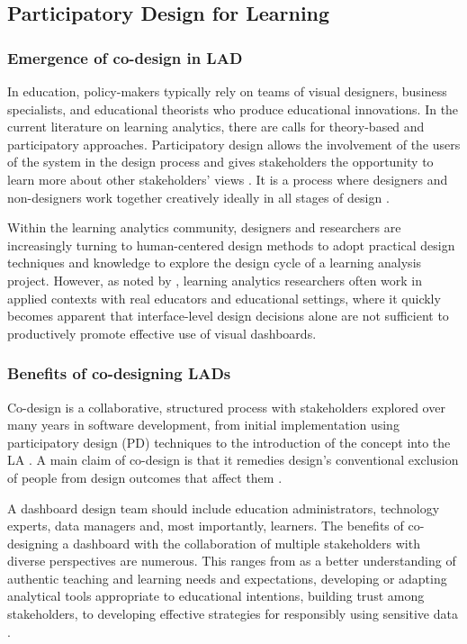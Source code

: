 \documentclass[manuscript,nonacm,12pt]{acmart}
\begin{document}
\subsection{Participatory Design for Learning}
\subsubsection{Emergence of co-design in LAD}
In education, policy-makers typically rely on teams of visual designers, business specialists, and educational theorists who produce educational innovations. 
In the current literature on learning analytics, there are calls for theory-based and participatory approaches. Participatory design allows the involvement of the users of the system in the design process and gives stakeholders the opportunity to learn more about other stakeholders' views \cite{unger2013designing}. It is a process where designers and non-designers work together creatively ideally in all stages of design 
\cite{Sanders2008}. 

Within the learning analytics community, designers and researchers are increasingly turning to human-centered design methods to adopt practical design techniques and knowledge to explore the design cycle of a learning analysis project. 
However, as noted by \citet{dollinger2018co}, learning analytics researchers often work in applied contexts with real educators and educational settings, where it quickly becomes apparent that interface-level design decisions alone are not sufficient to productively promote effective use of visual dashboards. 


\subsubsection{Benefits of co-designing LADs}
Co-design is a collaborative, structured process with stakeholders explored over many years in software development, from initial implementation using participatory design (PD) techniques to the introduction of the concept into the LA \cite{prieto2020engaging}.
A main claim of co-design is that it remedies design’s conventional exclusion of people from design outcomes that affect them \cite{taffe2015hybrid}. 

A dashboard design team should include education administrators, technology experts, data managers and, most importantly, learners. The benefits of co-designing a dashboard with the collaboration of multiple stakeholders with diverse perspectives are numerous. 
This ranges from as a better understanding of authentic teaching and learning needs and expectations, developing or adapting analytical tools appropriate to educational intentions, building trust among stakeholders, to developing effective strategies for responsibly using sensitive data \cite{beattie2014creepy}.
\end{document}
